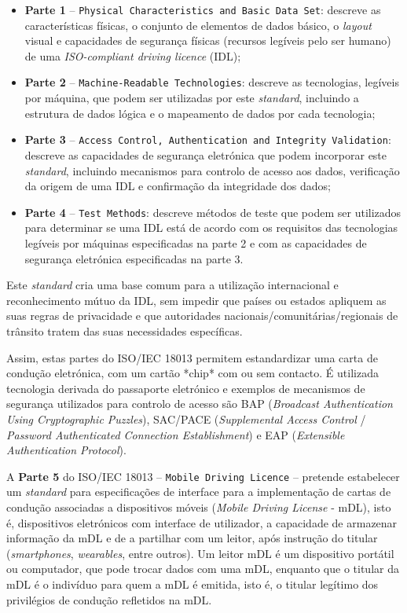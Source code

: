 \documentclass[11pt]{article}
\begin{document}
\begin{itemize}
	\item \textbf{Parte 1} -- \texttt{Physical Characteristics and Basic Data Set}: descreve as características físicas, o conjunto de elementos de dados básico, o \textit{layout} visual e capacidades de segurança físicas (recursos legíveis pelo ser humano) de uma \textit{ISO-compliant driving licence} (IDL);
	\item \textbf{Parte 2} -- \texttt{Machine-Readable Technologies}: descreve as tecnologias, legíveis por máquina, que podem ser utilizadas por este \textit{standard}, incluindo a estrutura de dados lógica e o mapeamento de dados por cada tecnologia;
	\item \textbf{Parte 3} -- \texttt{Access Control, Authentication and Integrity Validation}: descreve as capacidades de segurança eletrónica que podem incorporar este \textit{standard}, incluindo mecanismos para controlo de acesso aos dados, verificação da origem de uma IDL e confirmação da integridade dos dados;
	\item \textbf{Parte 4} -- \texttt{Test Methods}: descreve métodos de teste que podem ser utilizados para determinar se uma IDL está de acordo com os requisitos das tecnologias legíveis por máquinas especificadas na parte 2 e com as capacidades de segurança eletrónica especificadas na parte 3.
\end{itemize}

Este \textit{standard} cria uma base comum para a utilização internacional e reconhecimento mútuo da IDL, sem impedir que países ou estados apliquem as suas regras de privacidade e que autoridades nacionais/comunitárias/regionais de trânsito tratem das suas necessidades específicas.

Assim, estas partes do ISO/IEC 18013 permitem estandardizar uma carta de condução eletrónica, com um cartão *chip* com ou sem contacto. É utilizada tecnologia derivada do passaporte eletrónico e exemplos de mecanismos de segurança utilizados para controlo de acesso são BAP (\textit{Broadcast Authentication Using Cryptographic Puzzles}), SAC/PACE (\textit{Supplemental Access Control} / \textit{Password Authenticated Connection Establishment}) e EAP (\textit{Extensible Authentication Protocol}).

A \textbf{Parte 5} do ISO/IEC 18013 -- \texttt{Mobile Driving Licence} -- pretende estabelecer um \textit{standard} para especificações de interface para a implementação de cartas de condução associadas a dispositivos móveis (\textit{Mobile Driving License} - mDL), isto é, dispositivos eletrónicos com interface de utilizador, a capacidade de armazenar informação da mDL e de a partilhar com um leitor, após instrução do titular (\textit{smartphones}, \textit{wearables}, entre outros). Um leitor mDL é um dispositivo portátil ou computador, que pode trocar dados com uma mDL, enquanto que o titular da mDL é o indivíduo para quem a mDL é emitida, isto é, o titular legítimo dos privilégios de condução refletidos na mDL.
\end{document}
